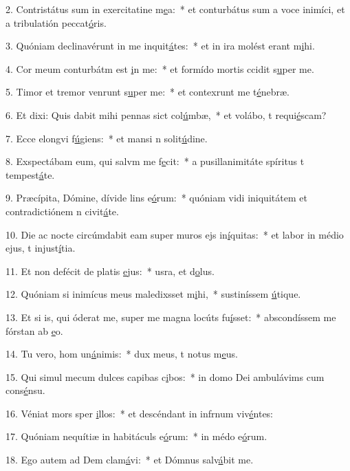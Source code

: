 2. Contristátus sum in exercitatine m\uline{e}a:~* et conturbátus sum a voce inimíci, et a tribulatión peccat\uline{ó}ris.\par 
3. Quóniam declinavérunt in me inquit\uline{á}tes:~* et in ira molést erant m\uline{i}hi.\par 
4. Cor meum conturbátm est \uline{i}n me:~* et formído mortis ccidit s\uline{u}per me.\par 
5. Timor et tremor venrunt s\uline{u}per me:~* et contexrunt me t\uline{é}nebræ.\par 
6. Et dixi: Quis dabit mihi pennas sict col\uline{ú}mbæ,~* et volábo, t requi\uline{é}scam?\par 
7. Ecce elongvi f\uline{ú}giens:~* et mansi n solit\uline{ú}dine.\par 
8. Exspectábam eum, qui salvm me f\uline{e}cit:~* a pusillanimitáte spíritus t tempest\uline{á}te.\par 
9. Præcípita, Dómine, dívide lins e\uline{ó}rum:~* quóniam vidi iniquitátem et contradictiónem n civit\uline{á}te.\par 
10. Die ac nocte circúmdabit eam super muros ejs in\uline{í}quitas:~* et labor in médio ejus, t injust\uline{í}tia.\par 
11. Et non defécit de platis \uline{e}jus:~* usra, et d\uline{o}lus.\par 
12. Quóniam si inimícus meus maledixsset m\uline{i}hi,~* sustiníssem \uline{ú}tique.\par 
13. Et si is, qui óderat me, super me magna locúts fu\uline{í}sset:~* abscondíssem me fórstan ab \uline{e}o.\par 
14. Tu vero, hom un\uline{á}nimis:~* dux meus, t notus m\uline{e}us.\par 
15. Qui simul mecum dulces capibas c\uline{i}bos:~* in domo Dei ambulávims cum cons\uline{é}nsu.\par 
16. Véniat mors sper \uline{i}llos:~* et descéndant in infrnum viv\uline{é}ntes:\par 
17. Quóniam nequítiæ in habitáculs e\uline{ó}rum:~* in médo e\uline{ó}rum.\par 
18. Ego autem ad Dem clam\uline{á}vi:~* et Dómnus salv\uline{á}bit me.\par 
